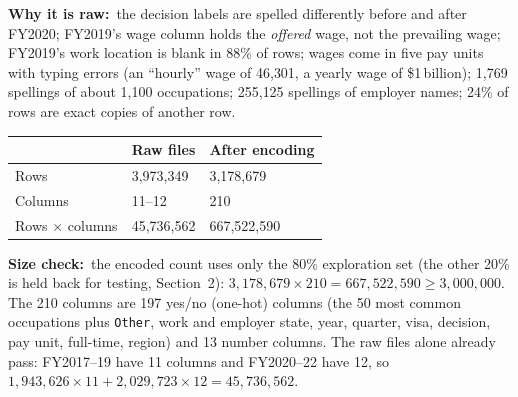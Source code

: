 \documentclass[10pt,a4paper,twocolumn]{article}
\newcommand{\field}[2]{\textbf{#1}~#2\par}
\newcommand{\code}[1]{\texttt{#1}}
\begin{document}
\field{Why it is raw:}{the decision labels are spelled differently before and after FY2020;
FY2019's wage column holds the \emph{offered} wage, not the prevailing wage; FY2019's work location
is blank in 88\% of rows; wages come in five pay units with typing errors (an ``hourly'' wage of
46{,}301, a yearly wage of \$1\,billion); 1{,}769 spellings of about 1{,}100 occupations;
255{,}125 spellings of employer names; 24\% of rows are exact copies of another row.}

{\small
\begin{tabularx}{\linewidth}{@{}L{2.9cm} Y Y@{}}
\toprule
 & \textbf{Raw files} & \textbf{After encoding} \\
\midrule
Rows & 3{,}973{,}349 & 3{,}178{,}679 \\
Columns & 11--12 & 210 \\
Rows $\times$ columns & 45{,}736{,}562 & 667{,}522{,}590 \\
\bottomrule
\end{tabularx}}

\field{Size check:}{the encoded count uses only the 80\% exploration set (the other 20\% is held
back for testing, Section~2): $3{,}178{,}679\times210=667{,}522{,}590\ge3{,}000{,}000$. The 210
columns are 197 yes/no (one-hot) columns (the 50 most common occupations plus \code{Other}, work
and employer state, year, quarter, visa, decision, pay unit, full-time, region) and 13 number
columns. The raw files alone already pass: FY2017--19 have 11 columns and FY2020--22 have 12, so
$1{,}943{,}626\times11+2{,}029{,}723\times12=45{,}736{,}562$.}
\end{document}
